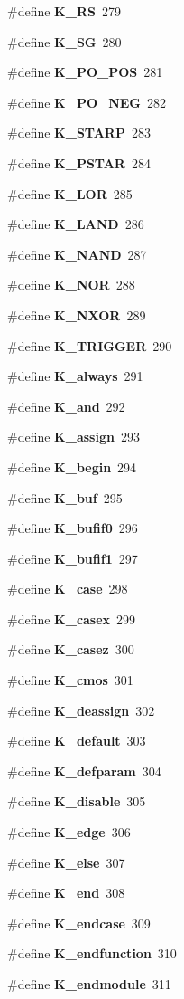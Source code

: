 \begin{CompactItemize}
\item 
\#define {\bf K\_\-RS}\ 279
\item 
\#define {\bf K\_\-SG}\ 280
\item 
\#define {\bf K\_\-PO\_\-POS}\ 281
\item 
\#define {\bf K\_\-PO\_\-NEG}\ 282
\item 
\#define {\bf K\_\-STARP}\ 283
\item 
\#define {\bf K\_\-PSTAR}\ 284
\item 
\#define {\bf K\_\-LOR}\ 285
\item 
\#define {\bf K\_\-LAND}\ 286
\item 
\#define {\bf K\_\-NAND}\ 287
\item 
\#define {\bf K\_\-NOR}\ 288
\item 
\#define {\bf K\_\-NXOR}\ 289
\item 
\#define {\bf K\_\-TRIGGER}\ 290
\item 
\#define {\bf K\_\-always}\ 291
\item 
\#define {\bf K\_\-and}\ 292
\item 
\#define {\bf K\_\-assign}\ 293
\item 
\#define {\bf K\_\-begin}\ 294
\item 
\#define {\bf K\_\-buf}\ 295
\item 
\#define {\bf K\_\-bufif0}\ 296
\item 
\#define {\bf K\_\-bufif1}\ 297
\item 
\#define {\bf K\_\-case}\ 298
\item 
\#define {\bf K\_\-casex}\ 299
\item 
\#define {\bf K\_\-casez}\ 300
\item 
\#define {\bf K\_\-cmos}\ 301
\item 
\#define {\bf K\_\-deassign}\ 302
\item 
\#define {\bf K\_\-default}\ 303
\item 
\#define {\bf K\_\-defparam}\ 304
\item 
\#define {\bf K\_\-disable}\ 305
\item 
\#define {\bf K\_\-edge}\ 306
\item 
\#define {\bf K\_\-else}\ 307
\item 
\#define {\bf K\_\-end}\ 308
\item 
\#define {\bf K\_\-endcase}\ 309
\item 
\#define {\bf K\_\-endfunction}\ 310
\item 
\#define {\bf K\_\-endmodule}\ 311
\item 

\end{CompactItemize}
